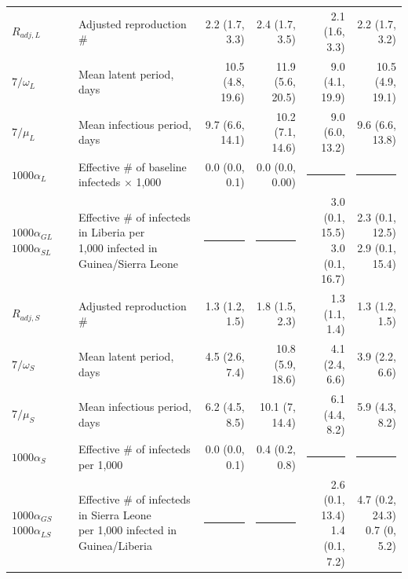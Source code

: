 \begin{table}
\begin{tabular}{llrrrr}
		\hline
		$ R_{adj,L} $& Adjusted reproduction \#& 2.2 (1.7, 3.3) & 2.4 (1.7, 3.5) & 2.1 (1.6, 3.3) & 2.2 (1.7, 3.2) \\ 
		$ 7/\omega_L $& Mean latent period, days& 10.5 (4.8, 19.6) & 11.9 (5.6, 20.5) & 9.0 (4.1, 19.9) & 10.5 (4.9, 19.1) \\ 
		$ 7/\mu_L $& Mean infectious period, days& 9.7 (6.6, 14.1) & 10.2 (7.1, 14.6) & 9.0 (6.0, 13.2) & 9.6 (6.6, 13.8) \\ 
		$ 1000\alpha_L $& Effective \# of baseline infecteds $ \times $ 1,000 & 0.0 (0.0, 0.1) & 0.0 (0.0, 0.00) &\rule[0.5ex]{0.75in}{0.5pt} &\rule[0.5ex]{0.75in}{0.5pt} \\ 
		\makecell[l]{$ 1000\alpha_{GL} $\\ $ 1000\alpha_{SL} $} & \makecell[l]{Effective \# of infecteds in Liberia per \\ \hspace{0.05in} 1,000 infected in Guinea/Sierra Leone} & \rule[0.5ex]{0.75in}{0.5pt} & \rule[0.5ex]{0.75in}{0.5pt} & \makecell[r]{3.0 (0.1, 15.5) \\ 3.0 (0.1, 16.7)} & \makecell[r]{2.3 (0.1, 12.5) \\ 2.9 (0.1, 15.4)}\\
		\hline
		$ R_{adj,S} $& Adjusted reproduction \#& 1.3 (1.2, 1.5) & 1.8 (1.5, 2.3) & 1.3 (1.1, 1.4) & 1.3 (1.2, 1.5) \\ 
		$ 7/\omega_S $& Mean latent period, days& 4.5 (2.6, 7.4) & 10.8 (5.9, 18.6) & 4.1 (2.4, 6.6) & 3.9 (2.2, 6.6) \\ 
		$ 7/\mu_S $& Mean infectious period, days & 6.2 (4.5, 8.5) & 10.1 (7, 14.4) & 6.1 (4.4, 8.2) & 5.9 (4.3, 8.2) \\ 
		$ 1000\alpha_S $& Effective \# of infecteds per 1,000 & 0.0 (0.0, 0.1) & 0.4 (0.2, 0.8) &  \rule[0.5ex]{0.75in}{0.5pt}&  \rule[0.5ex]{0.75in}{0.5pt} \\ 
		\makecell[l]{$ 1000\alpha_{GS} $\\ $ 1000\alpha_{LS} $} & \makecell[l]{Effective \# of infecteds in Sierra Leone\\ \hspace{0.05in} per 1,000 infected in Guinea/Liberia} & \rule[0.5ex]{0.75in}{0.5pt} & \rule[0.5ex]{0.75in}{0.5pt} & \makecell[r]{2.6 (0.1, 13.4) \\ 1.4 (0.1, 7.2)} & \makecell[r]{4.7 (0.2, 24.3) \\ 0.7 (0, 5.2)} \\
		\hline
	\end{tabular}
\end{table}

